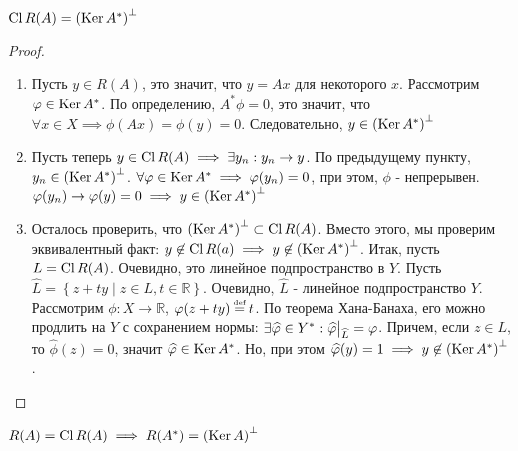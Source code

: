 \begin{theorem}
	$\operatorname{Cl} R(A) = \left( \operatorname{Ker} A^*\right)^\bot$
\end{theorem}
\begin{proof}
	\begin{enumerate}[leftmargin=*]
		\item 
		Пусть $y \in R(A)$, это значит, что $y = Ax$ для некоторого $x$.
		Рассмотрим $\varphi \in \operatorname{Ker} A^*$. По определению, $A^*\phi = 0$, это значит, 
		что $\forall x \in X \implies \phi(Ax) = \phi(y) = 0$.
		Следовательно, $y \in \left( \operatorname{Ker} A^*\right)^\bot$
		\item 
		Пусть теперь $y \in \operatorname{Cl} R(A) \implies \exists y_n : y_n \rightarrow y$.
		По предыдущему пункту, $y_n \in \left( \operatorname{Ker} A^*\right)^\bot$.
		$\forall \varphi \in \operatorname{Ker} A^* \implies \varphi(y_n) = 0$, при этом, $\phi$ - непрерывен.
		$\varphi(y_n) \rightarrow \varphi(y) = 0 \implies y \in \left( \operatorname{Ker} A^*\right)^\bot$
		\item
		Осталось проверить, что $\left( \operatorname{Ker} A^*\right)^\bot \subset \operatorname{Cl} R(A)$.
		Вместо этого, мы проверим эквивалентный факт:
		$y \not\in \operatorname{Cl} R(a) \implies y \not\in \left( \operatorname{Ker} A^*\right)^\bot$.
		Итак, пусть $L = \operatorname{Cl} R(A)$. Очевидно, это линейное подпространство в $Y$.
		Пусть $\widehat{L} = \left\{ z + ty \mid z \in L, t \in \mathbb{R}\right\}$.
		Очевидно, $\widehat{L}$ - линейное подпространство $Y$.
		Рассмотрим $\phi : X \rightarrow \mathbb{R}$, $\phi(z + ty) \defeq t$.
		По теорема Хана-Банаха, его можно продлить на $Y$ с сохранением нормы:
		$\exists \widehat{\phi} \in Y^* : \restr{\widehat{\phi}}{\widehat{L}} = \phi$.
		Причем, если $z \in L$, то $\widehat{\phi}(z) = 0$, значит $\widehat{\varphi} \in \operatorname{Ker} A^*$.
		Но, при этом $\widehat{\varphi}(y) = 1 \implies y \not\in \left( \operatorname{Ker} A^*\right)^\bot$.
	\end{enumerate}

\end{proof}
\begin{theorem}
	$R(A) = \operatorname{Cl} R(A) \implies R(A^*) = \left( \operatorname{Ker} A\right)^\bot$
\end{theorem}
